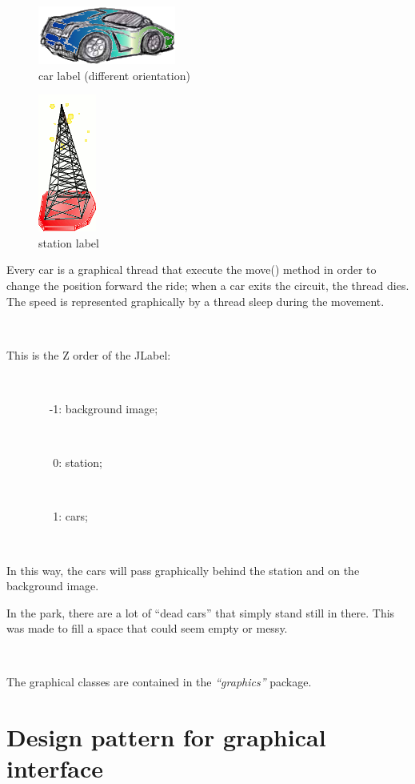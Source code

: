 \documentclass[a4paper,titlepage]{article}
\begin{document}
\begin{figure}[!ht]
\centering
\includegraphics[scale=0.2]{../car2.png}
\caption{car label (different orientation)}
\end{figure}

\begin{figure}[!ht]
\centering
\includegraphics[scale=0.5]{../radio.png}
\caption{station label}
\end{figure}


Every car is a graphical thread that execute the move() method in order to change the position forward the ride; when a car exits the circuit, the thread dies. The speed is represented graphically by a thread sleep during the movement.

~

This is the Z order of the JLabel:

~

~ ~ ~ ~ ~-1: background image;

~

~ ~ ~ ~ ~ 0: station;

~

~ ~ ~ ~ ~ 1: cars;

~

In this way, the cars will pass graphically behind the station and on the background image.


In the park, there are a lot of ``dead cars'' that simply stand still in there. This was made to fill a space that could seem empty or messy.

~

The graphical classes are contained in the \textit{``graphics''} package.

\section{Design pattern for graphical interface}
\end{document}

